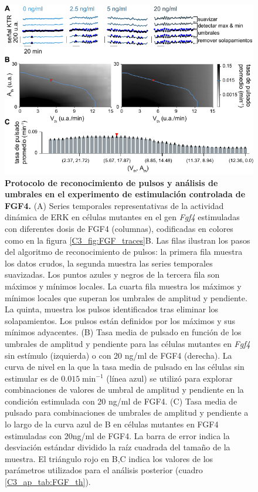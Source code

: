 \documentclass[./main.tex]{subfiles}
\begin{document}
\begin{subappendices}
\begin{figure}
    \centering
    \includegraphics[width=1\columnwidth]{figures/chapter3/C3_FGF_pulse_detection.pdf}\caption{\textbf{Protocolo de reconocimiento de pulsos y análisis de umbrales en el experimento de estimulación controlada de FGF4.} (A) Series temporales representativas de la actividad dinámica de ERK en células mutantes en el gen \textit{Fgf4} estimuladas con diferentes dosis de FGF4 (columnas), codificadas en colores como en la figura \ref{C3_fig:FGF_traces}B. Las filas ilustran los pasos del algoritmo de reconocimiento de pulsos: la primera fila muestra los datos crudos, la segunda muestra las series temporales suavizadas. Los puntos azules y negros de la tercera fila son máximos y mínimos locales. La cuarta fila muestra los máximos y mínimos locales que superan los umbrales de amplitud y pendiente. La quinta, muestra los pulsos identificados tras eliminar los solapamientos. Los pulsos están definidos por los máximos y sus mínimos adyacentes. (B) Tasa media de pulsado en función de los umbrales de amplitud y pendiente para las células mutantes en \textit{Fgf4} sin estímulo (izquierda) o con 20 ng/ml de FGF4 (derecha). La curva de nivel en la que la tasa media de pulsado en las células sin estimular es de $0.015 \;\text{min}^{-1}$ (línea azul) se utilizó para explorar combinaciones de valores de umbral de amplitud y pendiente en la condición estimulada con 20 ng/ml de FGF4. (C) Tasa media de pulsado para combinaciones de umbrales de amplitud y pendiente a lo largo de la curva azul de B en células mutantes en FGF4 estimuladas con 20ng/ml de FGF4. La barra de error indica la desviación estándar dividido la raíz cuadrada del tamaño de la muestra. El triángulo rojo en B,C indica los valores de los parámetros utilizados para el análisis posterior (cuadro \ref{C3_ap_tab:FGF_th}).}
    \label{C3_ap_fig:FGF_pulse_detection}
\end{figure}


\end{subappendices}
\end{document}

